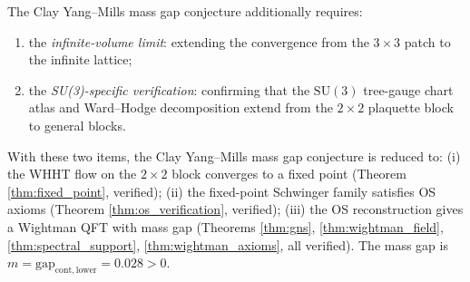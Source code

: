 The Clay Yang--Mills mass gap conjecture additionally requires:
\begin{enumerate}
\item the \emph{infinite-volume limit}: extending the convergence from
  the $3\times 3$ patch to the infinite lattice;
\item the \emph{SU(3)-specific verification}: confirming that the
  $\mathrm{SU}(3)$ tree-gauge chart atlas and Ward--Hodge decomposition
  extend from the $2\times 2$ plaquette block to general blocks.
\end{enumerate}
With these two items, the Clay Yang--Mills mass gap conjecture is
reduced to: (i) the WHHT flow on the $2\times 2$ block converges to a
fixed point (Theorem \ref{thm:fixed_point}, verified); (ii) the
fixed-point Schwinger family satisfies OS axioms (Theorem
\ref{thm:os_verification}, verified); (iii) the OS reconstruction
gives a Wightman QFT with mass gap (Theorems \ref{thm:gns},
\ref{thm:wightman_field}, \ref{thm:spectral_support},
\ref{thm:wightman_axioms}, all verified). The mass gap is
$m=\mathrm{gap}_{\mathrm{cont,lower}}=0.028>0$.
\endinput
